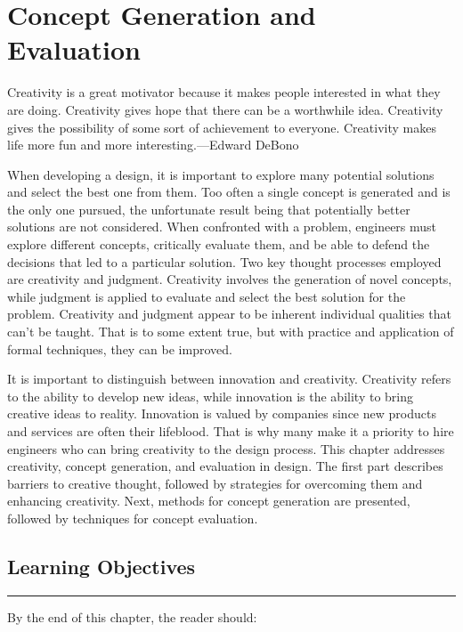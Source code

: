 \chapter{Concept Generation and Evaluation}
\label{chapter:conceptGen}
\graphicspath{ {./chapter04/Fig} }

\begin{itquote}
Creativity is a great motivator because it makes people interested in
what they are doing. Crea­tivity gives hope that there can be a
worthwhile idea. Creativity gives the possibility of some sort of
achievement to everyone. Creativity makes life more fun and more
interesting.---Edward DeBono
\end{itquote}

When developing a design, it is important to explore many potential
solutions and select the best one from them. Too often a single concept
is generated and is the only one pursued, the unfortunate result being
that potentially better solutions are not considered. When confronted
with a problem, engineers must explore different concepts, critically
evaluate them, and be able to defend the decisions that led to a
particular solution. Two key thought processes employed are creativity
and judgment. Creativity involves the generation of novel con­cepts,
while judgment is applied to evaluate and select the best solution for
the problem. Creativity and judgment appear to be inherent individual
qualities that can't be taught. That is to some extent true, but with
practice and application of formal techniques, they can be im­proved.

It is important to distinguish between innovation and creativity.
Creativity refers to the ability to develop new ideas, while innovation
is the ability to bring creative ideas to reality. Innovation is valued
by companies since new products and services are often their life­blood.
That is why many make it a priority to hire engineers who can bring
creativity to the design process. This chapter addresses creativity,
concept generation, and evaluation in design. The first part describes
barriers to creative thought, followed by strategies for overcoming them
and enhancing creativity. Next, methods for concept generation are
presented, followed by techniques for concept evaluation.

\section*{Learning Objectives}
\noindent\rule{\linewidth}{1pt}
By the end of this chapter, the reader should:


